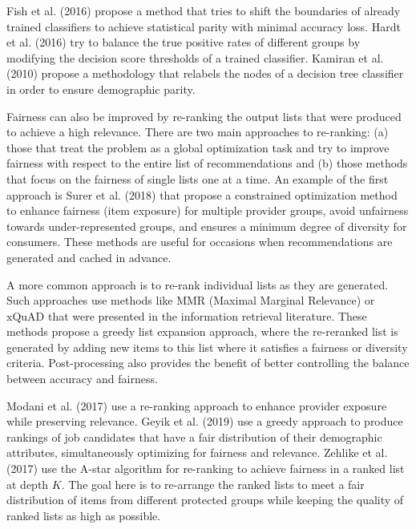         Fish et al. (2016) \cite{fish2016confidence} propose a method that tries to shift the boundaries of already trained classifiers to achieve statistical parity with minimal accuracy loss. Hardt et al. (2016) \cite{hardt2016equality} try to balance the true positive rates of different groups by modifying the decision score thresholds of a trained classifier. Kamiran et al.(2010) \cite{kamiran2010discrimination} propose a methodology that relabels the nodes of a decision tree classifier in order to ensure demographic parity.

        Fairness can also be improved by re-ranking the output lists that were produced to achieve a high relevance. There are two main approaches to re-ranking: (a) those that treat the problem as a global optimization task and try to improve fairness with respect to the entire list of recommendations and (b) those methods that focus on the fairness of single lists one at a time. An example of the first approach is Surer et al. (2018) \cite{surer2018multistakeholder} that propose a constrained optimization method to enhance fairness (item exposure) for multiple provider groups, avoid unfairness towards under-represented groups, and ensures a minimum degree of diversity for consumers. These methods are useful for occasions when recommendations are generated and cached in advance.

        A more common approach is to re-rank individual lists as they are generated. Such approaches use methods like MMR (Maximal Marginal Relevance) \cite{carbonell1998use} or xQuAD \cite{santos2010explicit} that were presented in the information retrieval literature. These methods propose a greedy list expansion approach, where the re-reranked list is generated by adding new items to this list where it satisfies a fairness or diversity criteria. Post-processing also provides the benefit of better controlling the balance between accuracy and fairness. 
        
        Modani et al. (2017) \cite{modani2017fairness} use a re-ranking approach to enhance provider exposure while preserving relevance. Geyik et al. (2019) \cite{Geyik2019} use a greedy approach to produce rankings of job candidates that have a fair distribution of their demographic attributes, simultaneously optimizing for fairness and relevance. Zehlike et al. (2017) \cite{zehlike2017fa} use the A-star algorithm for re-ranking to achieve fairness in a ranked list at depth $K$. The goal here is to re-arrange the ranked lists to meet a fair distribution of items from different protected groups while keeping the quality of ranked lists as high as possible. 


